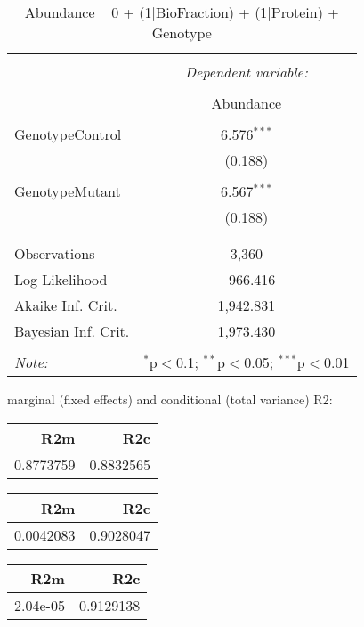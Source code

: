 \documentclass[11pt]{report}
\begin{document}
\begin{table}[!htbp] \centering 
  \caption{Abundance ~ 0 + (1|BioFraction) + (1|Protein) + Genotype} 
  \label{} 
\begin{tabular}{@{\extracolsep{5pt}}lc} 
\\[-1.8ex]\hline 
\hline \\[-1.8ex] 
 & \multicolumn{1}{c}{\textit{Dependent variable:}} \\ 
\cline{2-2} 
\\[-1.8ex] & Abundance \\ 
\hline \\[-1.8ex] 
 GenotypeControl & 6.576$^{***}$ \\ 
  & (0.188) \\ 
  & \\ 
 GenotypeMutant & 6.567$^{***}$ \\ 
  & (0.188) \\ 
  & \\ 
\hline \\[-1.8ex] 
Observations & 3,360 \\ 
Log Likelihood & $-$966.416 \\ 
Akaike Inf. Crit. & 1,942.831 \\ 
Bayesian Inf. Crit. & 1,973.430 \\ 
\hline 
\hline \\[-1.8ex] 
\textit{Note:}  & \multicolumn{1}{r}{$^{*}$p$<$0.1; $^{**}$p$<$0.05; $^{***}$p$<$0.01} \\ 
\end{tabular} 
\end{table} 
marginal (fixed effects) and conditional (total variance) R2:

\begin{tabular}{r|r}
\hline
R2m & R2c\\
\hline
0.8773759 & 0.8832565\\
\hline
\end{tabular}

\begin{tabular}{r|r}
\hline
R2m & R2c\\
\hline
0.0042083 & 0.9028047\\
\hline
\end{tabular}

\begin{tabular}{r|r}
\hline
R2m & R2c\\
\hline
2.04e-05 & 0.9129138\\
\hline
\end{tabular}
\end{document}
